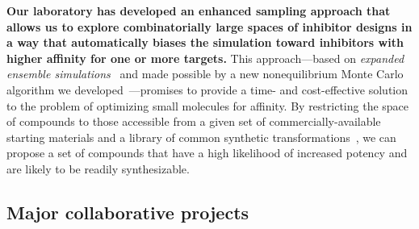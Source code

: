\documentclass[10pt]{article}
\begin{document}
{\bf Our laboratory has developed an enhanced sampling approach that allows us to explore combinatorially large spaces of inhibitor designs in a way that automatically biases the simulation toward inhibitors with higher affinity for one or more targets.}
This approach---based on \emph{expanded ensemble simulations}~\cite{lyubartsev:jcp:1992:expanded-ensembles} and made possible by a new nonequilibrium Monte Carlo algorithm we developed~\cite{ncmc}---promises to provide a time- and cost-effective solution to the problem of optimizing small molecules for affinity.
By restricting the space of compounds to those accessible from a given set of commercially-available starting materials and a library of common synthetic transformations~\cite{Roughley:2011:J.Med.Chem.}, we can propose a set of compounds that have a high likelihood of increased potency and are likely to be readily synthesizable.


%
%


\subsection*{Major collaborative projects}
\end{document}
